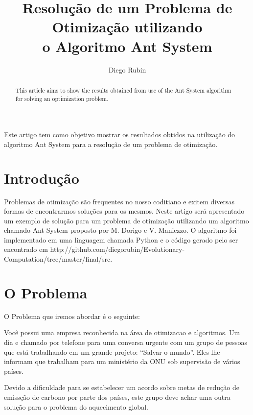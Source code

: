 \documentclass[12pt]{article}
\title{Resolução de um Problema de Otimização utilizando \\o Algoritmo Ant System}
\author{Diego Rubin\inst{1}}
\begin{document}
 

\maketitle

\begin{abstract}
 This article aims to show the results 
 obtained from use of the Ant System algorithm 
 for solving an optimization problem. 
\end{abstract}

\begin{resumo} 
 Este artigo tem como objetivo mostrar os
 resultados obtidos na utilização do algoritmo
 Ant System para a resolução de um problema
 de otimização.
\end{resumo}


\section{Introdução}

Problemas de otimização são frequentes no nosso coditiano e exitem 
diversas formas de encontrarmos soluções para os mesmos. Neste artigo
será apresentado um exemplo de solução para um problema de otimização
utilizando um algoritmo chamado Ant System proposto por M. Dorigo e V. Maniezzo.
O algoritmo foi implementado em uma linguagem chamada Python e o 
código gerado pelo ser encontrado em http://github.com/diegorubin/Evolutionary-Computation/tree/master/final/src.

\section{O Problema} \label{sec:firstpage}

O Problema que iremos abordar é o seguinte:

Você possui uma empresa reconhecida na área de otimizacao e algoritmos. 
Um dia e chamado por telefone para uma conversa urgente com um grupo 
de pessoas que está trabalhando em um grande projeto: “Salvar o mundo”. 
Eles lhe informam que trabalham para um ministério da ONU sob 
supervisão de vários países.

Devido a dificuldade para se estabelecer um acordo sobre metas de 
redução de emissção de carbono por parte dos países, este grupo deve 
achar uma outra solução para o problema do aquecimento global. 
\end{document}
